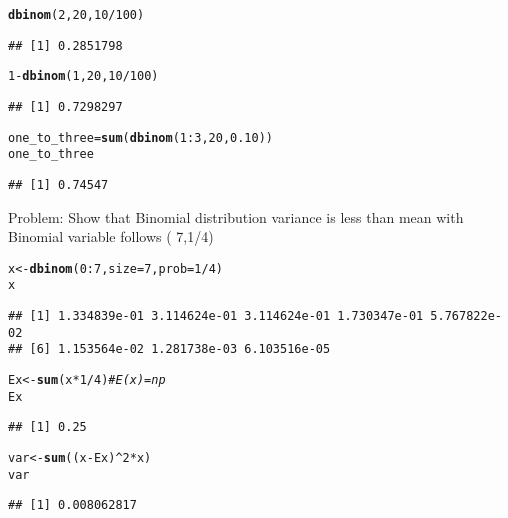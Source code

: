 \documentclass{article}\usepackage[]{graphicx}\usepackage[]{xcolor}
\makeatletter
\newcommand{\hlnum}[1]{\textcolor[rgb]{0.686,0.059,0.569}{#1}}%
\newcommand{\hlcom}[1]{\textcolor[rgb]{0.678,0.584,0.686}{\textit{#1}}}%
\newcommand{\hlopt}[1]{\textcolor[rgb]{0,0,0}{#1}}%
\newcommand{\hldef}[1]{\textcolor[rgb]{0.345,0.345,0.345}{#1}}%
\newcommand{\hlkwb}[1]{\textcolor[rgb]{0.69,0.353,0.396}{#1}}%
\newcommand{\hlkwc}[1]{\textcolor[rgb]{0.333,0.667,0.333}{#1}}%
\newcommand{\hlkwd}[1]{\textcolor[rgb]{0.737,0.353,0.396}{\textbf{#1}}}%
\newenvironment{kframe}{%
 \def\at@end@of@kframe{}%
 \ifinner\ifhmode%
  \def\at@end@of@kframe{\end{minipage}}%
  \begin{minipage}{\columnwidth}%
 \fi\fi%
 \def\FrameCommand##1{\hskip\@totalleftmargin \hskip-\fboxsep
 \colorbox{shadecolor}{##1}\hskip-\fboxsep
     \hskip-\linewidth \hskip-\@totalleftmargin \hskip\columnwidth}%
 \MakeFramed {\advance\hsize-\width
   \@totalleftmargin\z@ \linewidth\hsize
   \@setminipage}}%
 {\par\unskip\endMakeFramed%
 \at@end@of@kframe}
\newenvironment{knitrout}{}{} %
\makeatother
\begin{document}
\begin{knitrout}
\color{fgcolor}\begin{kframe}
\begin{alltt}
\hlkwd{dbinom}\hldef{(}\hlnum{2}\hldef{,}\hlnum{20}\hldef{,}\hlnum{10}\hlopt{/}\hlnum{100}\hldef{)}
\end{alltt}
\begin{verbatim}
## [1] 0.2851798
\end{verbatim}
\begin{alltt}
\hlnum{1}\hlopt{-}\hlkwd{dbinom}\hldef{(}\hlnum{1}\hldef{,}\hlnum{20}\hldef{,}\hlnum{10}\hlopt{/}\hlnum{100}\hldef{)}
\end{alltt}
\begin{verbatim}
## [1] 0.7298297
\end{verbatim}
\begin{alltt}
\hldef{one_to_three}\hlkwb{=}\hlkwd{sum}\hldef{(}\hlkwd{dbinom}\hldef{(}\hlnum{1}\hlopt{:}\hlnum{3}\hldef{,}\hlnum{20}\hldef{,}\hlnum{0.10}\hldef{))}
\hldef{one_to_three}
\end{alltt}
\begin{verbatim}
## [1] 0.74547
\end{verbatim}
\end{kframe}
\end{knitrout}
Problem: \newline
Show that Binomial distribution variance is less than mean with Binomial
variable follows ( 7,1/4)
\begin{knitrout}
\color{fgcolor}\begin{kframe}
\begin{alltt}
\hldef{x} \hlkwb{<-} \hlkwd{dbinom}\hldef{(}\hlnum{0}\hlopt{:}\hlnum{7}\hldef{,}\hlkwc{size} \hldef{=} \hlnum{7}\hldef{,} \hlkwc{prob} \hldef{=} \hlnum{1}\hlopt{/}\hlnum{4} \hldef{)}
\hldef{x}
\end{alltt}
\begin{verbatim}
## [1] 1.334839e-01 3.114624e-01 3.114624e-01 1.730347e-01 5.767822e-02
## [6] 1.153564e-02 1.281738e-03 6.103516e-05
\end{verbatim}
\begin{alltt}
\hldef{Ex} \hlkwb{<-} \hlkwd{sum}\hldef{(x}\hlopt{*}\hlnum{1}\hlopt{/}\hlnum{4}\hldef{)} \hlcom{#E(x)=np}
\hldef{Ex}
\end{alltt}
\begin{verbatim}
## [1] 0.25
\end{verbatim}
\begin{alltt}
\hldef{var} \hlkwb{<-} \hlkwd{sum}\hldef{((x}\hlopt{-}\hldef{Ex)}\hlopt{^}\hlnum{2}\hlopt{*}\hldef{x)}
\hldef{var}
\end{alltt}
\begin{verbatim}
## [1] 0.008062817
\end{verbatim}
\end{kframe}
\end{knitrout}
\end{document}
